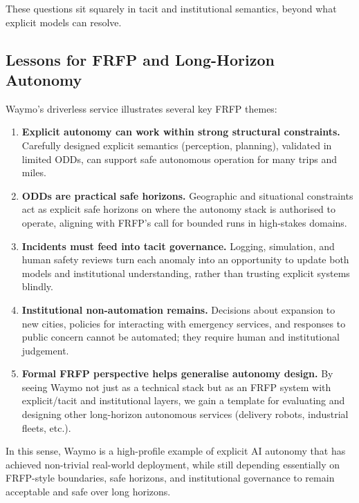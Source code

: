 These questions sit squarely in tacit and institutional semantics, beyond
what explicit models can resolve.

\subsection{Lessons for FRFP and Long-Horizon Autonomy}

Waymo’s driverless service illustrates several key FRFP themes:

\begin{enumerate}
  \item \textbf{Explicit autonomy can work within strong structural
        constraints.}
        Carefully designed explicit semantics (perception, planning),
        validated in limited ODDs, can support safe autonomous operation
        for many trips and miles.

  \item \textbf{ODDs are practical safe horizons.}
        Geographic and situational constraints act as explicit safe horizons
        on where the autonomy stack is authorised to operate, aligning with
        FRFP’s call for bounded runs in high-stakes domains.

  \item \textbf{Incidents must feed into tacit governance.}
        Logging, simulation, and human safety reviews turn each anomaly
        into an opportunity to update both models and institutional
        understanding, rather than trusting explicit systems blindly.

  \item \textbf{Institutional non-automation remains.}
        Decisions about expansion to new cities, policies for interacting
        with emergency services, and responses to public concern cannot be
        automated; they require human and institutional judgement.

  \item \textbf{Formal FRFP perspective helps generalise autonomy design.}
        By seeing Waymo not just as a technical stack but as an FRFP system
        with explicit/tacit and institutional layers, we gain a template for
        evaluating and designing other long-horizon autonomous services
        (delivery robots, industrial fleets, etc.).
\end{enumerate}

In this sense, Waymo is a high-profile example of explicit AI autonomy that
has achieved non-trivial real-world deployment, while still depending
essentially on FRFP-style boundaries, safe horizons, and institutional
governance to remain acceptable and safe over long horizons.
